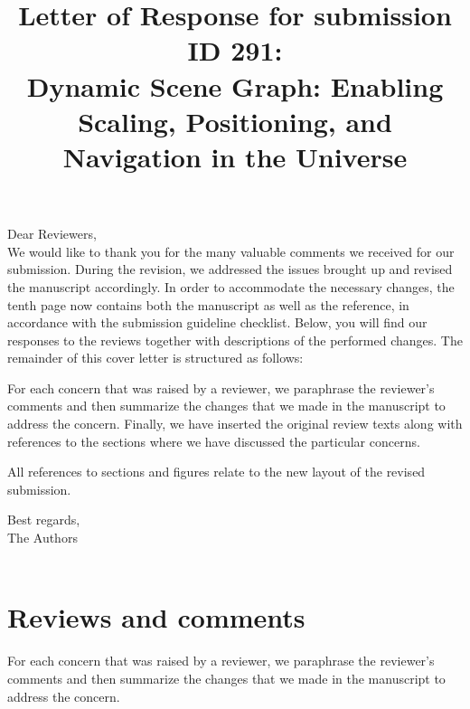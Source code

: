 \documentclass{article}
\date{}
\begin{document}
\title{Letter of Response for submission ID 291: \\Dynamic Scene Graph: Enabling Scaling, Positioning, and Navigation in the Universe}
\maketitle

Dear Reviewers, \\

We would like to thank you for the many valuable comments we received for our submission.
During the revision, we addressed the issues brought up and revised the manuscript accordingly.
In order to accommodate the necessary changes, the tenth page now contains both the manuscript as well as the reference, in accordance with the submission guideline checklist.
Below, you will find our responses to the reviews together with descriptions of the performed changes.
The remainder of this cover letter is structured as follows:

For each concern that was raised by a reviewer, we paraphrase the reviewer's comments and then summarize the changes that we made in the manuscript to address the concern.
Finally, we have inserted the original review texts along with references to the sections where we have discussed the particular concerns.

All references to sections and figures relate to the new layout of the revised submission.


Best regards, \\
The Authors \\\\

\newpage

\section{Reviews and comments}
For each concern that was raised by a reviewer, we paraphrase the reviewer's comments and then summarize the changes that we made in the manuscript to address the concern.

\vspace*{1cm}
\end{document}
